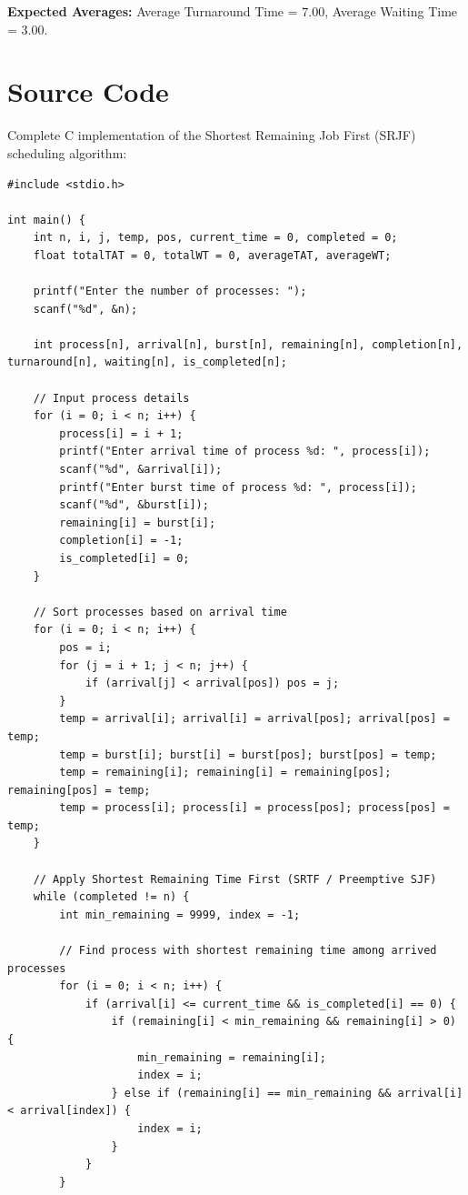 \documentclass[10pt,a4paper]{article}
\begin{document}
\noindent\textbf{Expected Averages:} Average Turnaround Time = $7.00$, Average Waiting Time = $3.00$.

\section{Source Code}
Complete C implementation of the Shortest Remaining Job First (SRJF) scheduling algorithm:

\begin{lstlisting}
#include <stdio.h>

int main() {
    int n, i, j, temp, pos, current_time = 0, completed = 0;
    float totalTAT = 0, totalWT = 0, averageTAT, averageWT;

    printf("Enter the number of processes: ");
    scanf("%d", &n);

    int process[n], arrival[n], burst[n], remaining[n], completion[n], turnaround[n], waiting[n], is_completed[n];

    // Input process details
    for (i = 0; i < n; i++) {
        process[i] = i + 1;
        printf("Enter arrival time of process %d: ", process[i]);
        scanf("%d", &arrival[i]);
        printf("Enter burst time of process %d: ", process[i]);
        scanf("%d", &burst[i]);
        remaining[i] = burst[i];
        completion[i] = -1;
        is_completed[i] = 0;
    }

    // Sort processes based on arrival time
    for (i = 0; i < n; i++) {
        pos = i;
        for (j = i + 1; j < n; j++) {
            if (arrival[j] < arrival[pos]) pos = j;
        }
        temp = arrival[i]; arrival[i] = arrival[pos]; arrival[pos] = temp;
        temp = burst[i]; burst[i] = burst[pos]; burst[pos] = temp;
        temp = remaining[i]; remaining[i] = remaining[pos]; remaining[pos] = temp;
        temp = process[i]; process[i] = process[pos]; process[pos] = temp;
    }

    // Apply Shortest Remaining Time First (SRTF / Preemptive SJF)
    while (completed != n) {
        int min_remaining = 9999, index = -1;

        // Find process with shortest remaining time among arrived processes
        for (i = 0; i < n; i++) {
            if (arrival[i] <= current_time && is_completed[i] == 0) {
                if (remaining[i] < min_remaining && remaining[i] > 0) {
                    min_remaining = remaining[i];
                    index = i;
                } else if (remaining[i] == min_remaining && arrival[i] < arrival[index]) {
                    index = i;
                }
            }
        }


\end{lstlisting}
\end{document}
